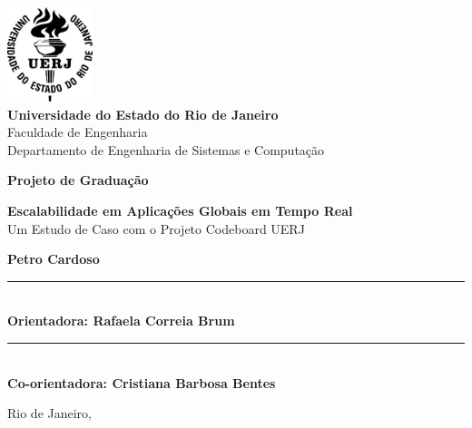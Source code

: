 \begin{titlepage}
    \begin{center}
        \includegraphics[width=2.5cm]{assets/uerj_logo.png}\\
        \vspace{0.5cm}
        \large \textbf{Universidade do Estado do Rio de Janeiro}\\
        \normalsize Faculdade de Engenharia\\
        \normalsize Departamento de Engenharia de Sistemas e Computação
        
        \vspace{2.5cm}
        
        \textbf{\Large Projeto de Graduação}
        
        \vfill
        \Large\textbf{Escalabilidade em Aplicações Globais em Tempo Real}\\
        \Large{Um Estudo de Caso com o Projeto Codeboard UERJ}
        \vfill
        
        \normalsize\textbf{Petro Cardoso}
        
        \vspace{2cm}
        
        \rule{8cm}{0.4pt}\\
        \normalsize\textbf{Orientadora: Rafaela Correia Brum}\\
        
        \vspace{1cm}
        
        \rule{8cm}{0.4pt}\\
        \normalsize\textbf{Co-orientadora: Cristiana Barbosa Bentes}
        
        \vfill
        
        \normalsize Rio de Janeiro, \the\year
    \end{center}
\end{titlepage}